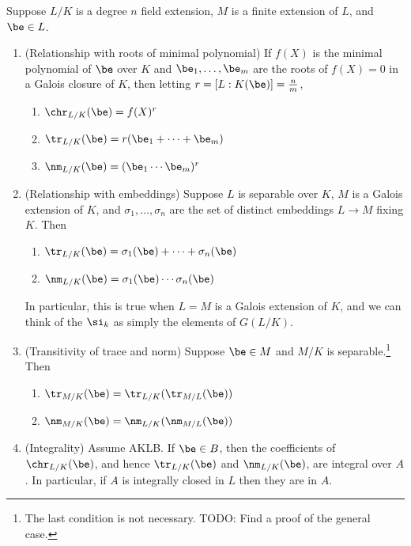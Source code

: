 \begin{pr}
Suppose $L/K$ is a degree $n$ field extension, $M$ is a finite extension of $L$, and $\be\in L$.
\begin{enumerate}
\item (Relationship with roots of minimal polynomial) If $f(X)$ is the minimal polynomial of $\be$ over $K$ and $\be_1,\ldots, \be_m$ are the roots of $f(X)=0$ in a Galois closure of $K$, then letting $r=[L:K(\be)]=\frac nm$, 
\begin{enumerate}
\item
$\chr_{L/K}(\be)=f(X)^r$
\item
$\tr_{L/K}(\be)=r(\be_1+\cdots +\be_m)$
\item
$\nm_{L/K}(\be)=(\be_1\cdots \be_m)^r$
\end{enumerate}
\item (Relationship with embeddings) Suppose $L$ is separable over $K$, $M$ is a Galois extension of $K$, and $\sigma_1,\ldots, \sigma_n$ are the set of distinct embeddings $L\to M$ fixing $K$. 
Then
\begin{enumerate}
\item
$\tr_{L/K}(\be)=\sigma_1(\be)+\cdots +\sigma_n(\be)$
\item
$\nm_{L/K}(\be)=\sigma_1(\be)\cdots \sigma_n(\be)$
\end{enumerate}
In particular, this is true when $L=M$ is a Galois extension of $K$, and we can think of the $\si_k$ as simply the elements of $G(L/K)$.
\item (Transitivity of trace and norm) Suppose $\be\in M$ and $M/K$ is separable.\footnote{The last condition is not necessary. TODO: Find a proof of the general case.} Then
\begin{enumerate}
\item
$\tr_{M/K}(\be)=\tr_{L/K}(\tr_{M/L}(\be))$
\item
$\nm_{M/K}(\be)=\nm_{L/K}(\nm_{M/L}(\be))$
\end{enumerate}
\item (Integrality) %
Assume AKLB. If $\be\in B$, then the coefficients of $\chr_{L/K}(\be)$, and hence $\tr_{L/K}(\be)$ and $\nm_{L/K}(\be)$, are integral over $A$. In particular, if $A$ is integrally closed in $L$ then they are in $A$.
\end{enumerate}
\end{pr}
